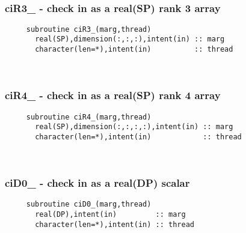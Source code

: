  
\mbox{}\hrulefill\ 

  \subsubsection{ciR3\_ - check in as a real(SP) rank 3 array}

\begin{verbatim} 
     subroutine ciR3_(marg,thread)
       real(SP),dimension(:,:,:),intent(in) :: marg
       character(len=*),intent(in)          :: thread
 \end{verbatim}%
 
 
\mbox{}\hrulefill\ 
 
  \subsubsection{ciR4\_ - check in as a real(SP) rank 4 array}

\begin{verbatim} 
     subroutine ciR4_(marg,thread)
       real(SP),dimension(:,:,:,:),intent(in) :: marg
       character(len=*),intent(in)            :: thread
 \end{verbatim}%
 
 
\mbox{}\hrulefill\ 
 
  \subsubsection{ciD0\_ - check in as a real(DP) scalar}

\begin{verbatim} 
     subroutine ciD0_(marg,thread)
       real(DP),intent(in)         :: marg
       character(len=*),intent(in) :: thread
 \end{verbatim}%
 

